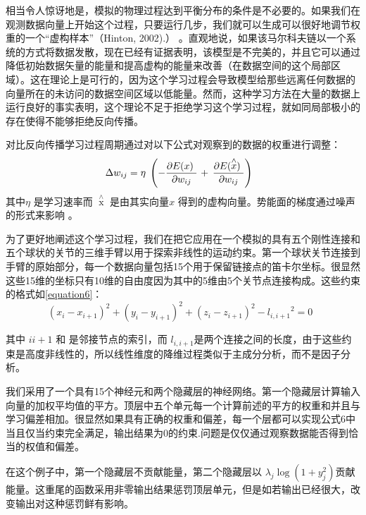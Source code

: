 \par{相当令人惊讶地是，模拟的物理过程达到平衡分布的条件是不必要的。如果我们在观测数据向量上开始这个过程，只要运行几步，我们就可以生成可以很好地调节权重的一个“虚构样本”（Hinton, 2002).） 。直观地说，如果该马尔科夫链以一个系统的方式将数据发散，现在已经有证据表明，该模型是不完美的，并且它可以通过降低初始数据矢量的能量和提高虚构的能量来改善（在数据空间的这个局部区域）。这在理论上是可行的，因为这个学习过程会导致模型给那些远离任何数据的向量所在的未访问的数据空间区域以低能量。然而，这种学习方法在大量的数据上运行良好的事实表明，这个理论不足于拒绝学习这个学习过程，就如同局部极小的存在使得不能够拒绝反向传播。}
\par{对比反向传播学习过程周期通过对以下公式对观察到的数据的权重进行调整：  \begin{equation}\label{equation5}\Delta {w_{ij}} = \eta \;\left( { - \frac{{\partial E(x){\kern 1pt} {\kern 1pt} {\kern 1pt} }}{{\partial {w_{ij}}}}{\kern 1pt}  + {\kern 1pt} {\kern 1pt} \frac{{\partial E(\mathop x\limits^ \wedge  ){\kern 1pt} {\kern 1pt} {\kern 1pt} }}{{\partial {w_{ij}}}}} \right){\kern 1pt} \;\;\end{equation}
其中$\eta$ 是学习速率而 $\mathop x\limits^ \wedge $ 是由其实向量$x$ 得到的虚构向量。势能面的梯度通过噪声的形式来影响 。}
	\par{为了更好地阐述这个学习过程，我们在把它应用在一个模拟的具有五个刚性连接和五个球状的关节的三维手臂以用于探索非线性的运动约束。第一个球状关节连接到手臂的原始部分，每一个数据向量包括15个用于保留链接点的笛卡尔坐标。很显然这些15维的坐标只有10维的自由度因为其中的5维由5个关节点连接构成。这些约束的格式如\ref{equation6}：
 \begin{equation}\label{equation6}
{\left( {{x_i} - {x_{i + 1}}} \right)^2} + {\left( {{y_i} - {y_{i + 1}}} \right)^2} + {\left( {{z_i} - {z_{i + 1}}} \right)^2} - {l_{i,i + 1}}^2 = 0\;\;
 \end{equation}

其中 $i$$i + 1$ 和 是邻接节点的索引，而 ${l_{i,i + 1}}$是两个连接之间的长度，由于这些约束是高度非线性的，所以线性维度的降维过程类似于主成分分析，而不是因子分析。}
\par{我们采用了一个具有15个神经元和两个隐藏层的神经网络。第一个隐藏层计算输入向量的加权平均值的平方。顶层中五个单元每一个计算前述的平方的权重和并且与学习偏差相加。很显然如果具有正确的权重和偏差，每一个层都可以实现公式6中当且仅当约束完全满足，输出结果为0的约束.问题是仅仅通过观察数据能否得到恰当的权值和偏差。}
\par{在这个例子中，第一个隐藏层不贡献能量，第二个隐藏层以 ${\lambda _j}\log (1 + y_j^2)$贡献能量。这重尾的函数采用非零输出结果惩罚顶层单元，但是如若输出已经很大，改变输出对这种惩罚鲜有影响。}
